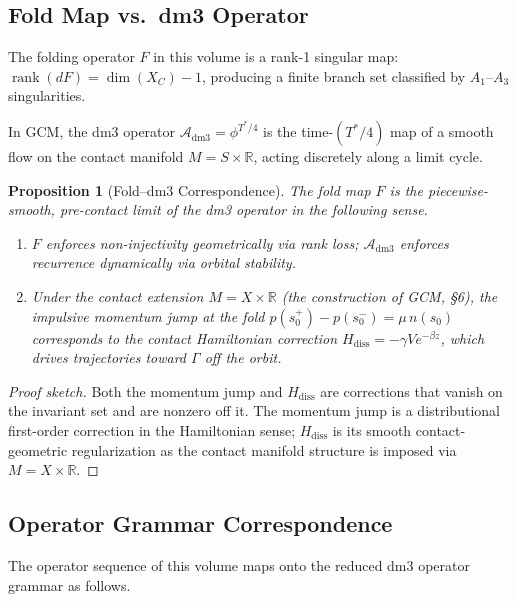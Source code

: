 \documentclass[12pt, oneside]{book}
\theoremstyle{plain}
\newtheorem{proposition}[theorem]{Proposition}
\theoremstyle{definition}
\theoremstyle{remark}
\begin{document}
\subsection{Fold Map vs.\ dm3 Operator}

The folding operator $F$ in this volume is a rank-1 singular map:
$\operatorname{rank}(dF) = \dim(X_C) - 1$, producing a finite
branch set classified by $A_1$--$A_3$ singularities.

In GCM, the dm3 operator
$\mathcal{A}_{\mathrm{dm3}} = \phi^{T^*/4}$
is the time-$(T^*/4)$ map of a smooth flow on the contact manifold
$M = S \times \mathbb{R}$, acting discretely along a limit cycle.

\begin{proposition}[Fold--dm3 Correspondence]\label{prop:fold}
The fold map $F$ is the piecewise-smooth, pre-contact limit of the
dm3 operator in the following sense.
\begin{enumerate}[label=\textup{(\roman*)}]
  \item $F$ enforces non-injectivity geometrically via rank loss;
        $\mathcal{A}_{\mathrm{dm3}}$ enforces recurrence dynamically
        via orbital stability.
  \item Under the contact extension $M = X \times \mathbb{R}$
        \textup{(}the construction of GCM, \S6\textup{)}, the
        impulsive momentum jump at the fold
        $p(s_0^+) - p(s_0^-) = \mu\,n(s_0)$
        corresponds to the contact Hamiltonian correction
        $H_{\mathrm{diss}} = -\gamma V e^{-\beta z}$,
        which drives trajectories toward $\Gamma$ off the orbit.
\end{enumerate}
\end{proposition}

\begin{proof}[Proof sketch]
Both the momentum jump and $H_{\mathrm{diss}}$ are corrections
that vanish on the invariant set and are nonzero off it. The
momentum jump is a distributional first-order correction in the
Hamiltonian sense; $H_{\mathrm{diss}}$ is its smooth
contact-geometric regularization as the contact manifold structure
is imposed via $M = X \times \mathbb{R}$.
\end{proof}

\subsection{Operator Grammar Correspondence}

The operator sequence of this volume maps onto the reduced dm3
operator grammar as follows.
\end{document}
